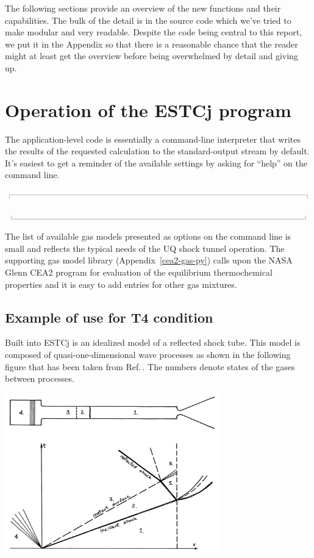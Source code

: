 \documentclass[10pt,a4paper]{article}
\newcommand{\topbar}{\ensuremath{
    \rule{0.1mm}{2.0mm} \rule[2.0mm]{159.5mm}{0.1mm} \rule{0.1mm}{2.0mm}
}}
\newcommand{\bottombar}{\ensuremath{
    \rule{0.1mm}{2.0mm} \rule{159.5mm}{0.1mm} \rule{0.1mm}{2.0mm}
}}
\begin{document}
\medskip
The following sections provide an overview of the new functions and their capabilities.
The bulk of the detail is in the source code which we've tried to make modular and very readable.
Despite the code being central to this report, we put it in the Appendix so that there is
a reasonable chance that the reader might at least get the overview 
before being overwhelmed by detail and giving up.

\newpage
\section{Operation of the ESTCj program}
%
The application-level code is essentially a command-line interpreter
that writes the results of the requested calculation to the standard-output stream
by default.
It's easiest to get a reminder of the available settings by asking for ``help''
on the command line.

\medskip
\noindent\topbar

\bottombar

The list of available gas models presented as options on the command line is small
and reflects the typical needs of the UQ shock tunnel operation.
The supporting gas model library (Appendix~\ref{cea2-gas-py}) 
calls upon the NASA Glenn CEA2 program 
for evaluation of the equilibrium thermochemical properties 
and it is easy to add entries for other gas mixtures.

\bigskip
\subsection{Example of use for T4 condition}
%
Built into ESTCj is an idealized model of a reflected shock tube.
This model is composed of quasi-one-dimensional wave processes 
as shown in the following figure that has been taken from Ref.\,\cite{krek_jacobs_93}.
The numbers denote states of the gases between processes.

\begin{center}
\includegraphics[width=0.7\textwidth]{../figs/shock-tube-process-fig-from-stn-report.png}
\end{center}
\end{document}

